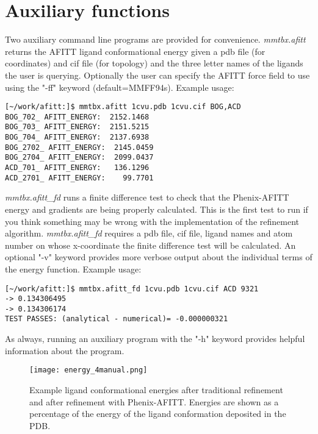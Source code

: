 \documentclass[11pt,letterpaper]{article}
\begin{document}
\section{Auxiliary functions}
Two auxiliary command line programs are provided for convenience. \textit{mmtbx.afitt} returns the  AFITT ligand conformational energy given a pdb file (for coordinates) and cif file (for topology) and the three letter names of the ligands the user is querying. Optionally the user can specify the AFITT force field to use using the "-ff" keyword (default=MMFF94s). Example usage:
\begin{lstlisting}
[~/work/afitt:]$ mmtbx.afitt 1cvu.pdb 1cvu.cif BOG,ACD
BOG_702_ AFITT_ENERGY:  2152.1468
BOG_703_ AFITT_ENERGY:  2151.5215
BOG_704_ AFITT_ENERGY:  2137.6938
BOG_2702_ AFITT_ENERGY:  2145.0459
BOG_2704_ AFITT_ENERGY:  2099.0437
ACD_701_ AFITT_ENERGY:   136.1296
ACD_2701_ AFITT_ENERGY:    99.7701
\end{lstlisting}

\textit{mmtbx.afitt\_fd} runs a finite difference test to check that the Phenix-AFITT energy and gradients are being properly calculated. This is the first test to run if you think something may be wrong with the implementation of the refinement algorithm. \textit{mmtbx.afitt\_fd} requires a pdb file, cif file, ligand names and atom number on whose x-coordinate the finite difference test will be calculated. An optional "-v" keyword provides more verbose output about the individual terms of the energy function. Example usage:

\begin{lstlisting}
[~/work/afitt:]$ mmtbx.afitt_fd 1cvu.pdb 1cvu.cif ACD 9321
-> 0.134306495
-> 0.134306174
TEST PASSES: (analytical - numerical)= -0.000000321
\end{lstlisting}

As always, running an auxiliary program with the "-h" keyword provides helpful information about the program.

    \begin{figure}[H]
        \centering
        \texttt{[image: energy\_4manual.png]}
        \caption{Example ligand conformational energies after traditional refinement and after refinement with Phenix-AFITT. Energies are shown as a percentage of the energy of the ligand conformation deposited in the PDB.}
    \end{figure}



\end{document}

